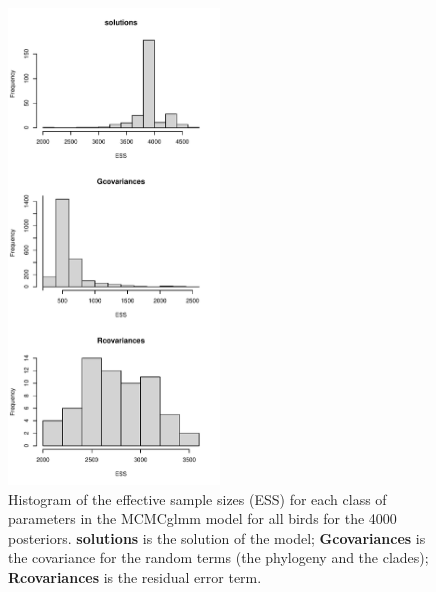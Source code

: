 \documentclass[12pt,a4paper]{article}
\begin{document}
\begin{figure}[H]
\centering
   \includegraphics[width=0.5\textwidth]{Figures/parameters_ESS_all_birds.pdf}
\caption{Histogram of the effective sample sizes (ESS) for each class of parameters in the MCMCglmm model for all birds for the 4000 posteriors. \textbf{solutions} is the solution of the model; \textbf{Gcovariances} is the covariance for the random terms (the phylogeny and the clades); \textbf{Rcovariances} is the residual error term.}
\label{Fig:model_ess_all_birds}
\end{figure}

\newpage
\end{document}
